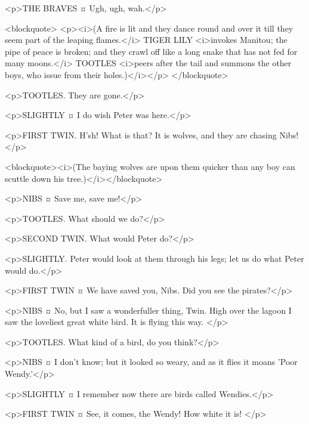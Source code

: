 <p>THE BRAVES ¤
Ugh, ugh, wah.</p>

<blockquote> <p><i>(A fire is lit and they dance round and over it till they seem part of the leaping flames.</i> TIGER LILY <i>invokes Manitou; the pipe of peace is broken; and they crawl off like a long snake that has not fed for many moons.</i> TOOTLES <i>peers after the tail and summons the other boys, who issue from their holes.)</i></p> </blockquote>

<p>TOOTLES. They are gone.</p>

<p>SLIGHTLY ¤
I do wish Peter was here.</p>

<p>FIRST TWIN. H'sh! What is that?
It is wolves, and they are chasing Nibs!</p>

<blockquote><i>(The baying wolves are upon them quicker than any boy can scuttle down his tree.)</i></blockquote>

<p>NIBS ¤
Save me, save me!</p>

<p>TOOTLES. What should we do?</p>

<p>SECOND TWIN. What would Peter do?</p>

<p>SLIGHTLY. Peter would look at them through his legs; let us do what Peter would do.</p>


<p>FIRST TWIN ¤
We have saved you, Nibs. Did you see the pirates?</p>

<p>NIBS ¤
No, but I saw a wonderfuller thing, Twin.
High over the lagoon I saw the loveliest great white bird. It is flying this way.
</p>

<p>TOOTLES. What kind of a bird, do you think?</p>

<p>NIBS ¤
I don't know; but it looked so weary, and as it flies it moans 'Poor Wendy.'</p>

<p>SLIGHTLY ¤
I remember now there are birds called Wendies.</p>

<p>FIRST TWIN ¤
See, it comes, the Wendy!
How white it is!
</p>

